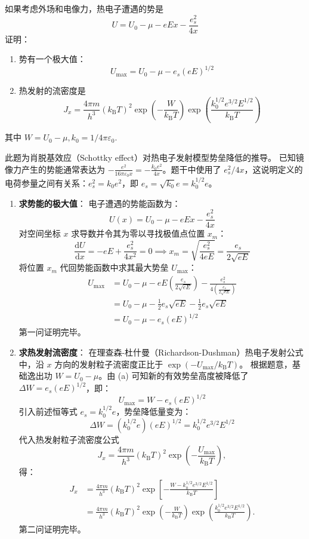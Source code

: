 \begin{exercise}\label{ex:28.7}
如果考虑外场和电像力，热电子遭遇的势是
$$ U = U_0 - \mu - eEx - \frac{e_s^2}{4x} $$
证明：
\begin{enumerate}
  \item[(a)] 势有一个极大值：
  $$ U_{\max} = U_0 - \mu - e_s(eE)^{1/2} $$
  \item[(b)] 热发射的流密度是
  $$ J_x = \frac{4\pi m}{h^3} (k_{\mathrm{B}}T)^2 \exp\left( - \frac{W}{k_{\mathrm{B}}T} \right) \exp\left( \frac{k_0^{1/2} e^{3/2} E^{1/2}}{k_{\mathrm{B}}T} \right) $$
\end{enumerate}
其中 $W = U_0 - \mu, k_0 = 1/4\pi\varepsilon_0$.
\end{exercise}
\begin{solution}
此题为肖脱基效应（Schottky effect）对热电子发射模型势垒降低的推导。
已知镜像力产生的势能通常表达为 $- \frac{e^2}{16\pi\varepsilon_0 x} = - \frac{k_0 e^2}{4x}$。题干中使用了 $e_s^2 / 4x$，这说明定义的电荷参量之间有关系：$e_s^2 = k_0 e^2$，即 $e_s = \sqrt{k_0} e = k_0^{1/2} e$。

\begin{enumerate}
    \item[(a)] \textbf{求势能的极大值}：
    电子遭遇的势能函数为：
    $$ U(x) = U_0 - \mu - eEx - \frac{e_s^2}{4x} $$
    对空间坐标 $x$ 求导数并令其为零以寻找极值点位置 $x_m$：
    $$ \frac{\mathrm{d}U}{\mathrm{d}x} = - eE + \frac{e_s^2}{4x^2} = 0 \implies x_m = \sqrt{\frac{e_s^2}{4eE}} = \frac{e_s}{2\sqrt{eE}} $$
    将位置 $x_m$ 代回势能函数中求其最大势垒 $U_{\max}$：
    \begin{align*}
        U_{\max} &= U_0 - \mu - eE \left( \frac{e_s}{2\sqrt{eE}} \right) - \frac{e_s^2}{4 \left( \frac{e_s}{2\sqrt{eE}} \right)} \\
                 &= U_0 - \mu - \frac{1}{2} e_s \sqrt{eE} - \frac{1}{2} e_s \sqrt{eE} \\
                 &= U_0 - \mu - e_s (eE)^{1/2}
    \end{align*}
    第一问证明完毕。

    \item[(b)] \textbf{求热发射流密度}：
    在理查森-杜什曼（Richardson-Dushman）热电子发射公式中，沿 $x$ 方向的发射粒子流密度正比于 $\exp(-U_{\max}/k_{\mathrm{B}}T)$。
    根据题意，基础逸出功 $W = U_0 - \mu$。由 (a) 可知新的有效势垒高度被降低了 $\Delta W = e_s (eE)^{1/2}$，即：
    $$ U_{\max} = W - e_s (eE)^{1/2} $$
    引入前述恒等式 $e_s = k_0^{1/2} e$，势垒降低量变为：
    $$ \Delta W = (k_0^{1/2} e) (eE)^{1/2} = k_0^{1/2} e^{3/2} E^{1/2} $$
    代入热发射粒子流密度公式
    $$ J_x=\frac{4\pi m}{h^3}(k_{\mathrm{B}}T)^2
       \exp\left(-\frac{U_{\max}}{k_{\mathrm{B}}T}\right), $$
    得：
    \begin{align*}
      J_x
      &=\frac{4\pi m}{h^3}(k_{\mathrm B}T)^2
        \exp\!\left[-\frac{W-k_0^{1/2}e^{3/2}E^{1/2}}{k_{\mathrm B}T}\right]\\
      &=\frac{4\pi m}{h^3}(k_{\mathrm B}T)^2
        \exp\!\left(-\frac{W}{k_{\mathrm B}T}\right)
        \exp\!\left(\frac{k_0^{1/2}e^{3/2}E^{1/2}}{k_{\mathrm B}T}\right).
    \end{align*}
    第二问证明完毕。
\end{enumerate}
\end{solution}
